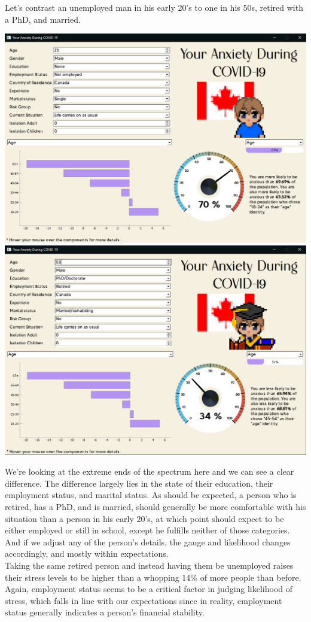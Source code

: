 \documentclass[fontsize=11pt]{article}
\begin{document}
	Let’s contrast an unemployed man in his early 20’s to one in his 50s, retired with a PhD, and married.
	\begin{center}
	\includegraphics[scale=0.30]{img/casestudy_screenshot_1}
	\includegraphics[scale=0.30]{img/casestudy_screenshot_2}
	\end{center}

	We’re looking at the extreme ends of the spectrum here and we can see a clear difference. The difference largely lies in the state of their education, their employment status, and marital status. As should be expected, a person who is retired, has a PhD, and is married, should generally be more comfortable with his situation than a person in his early 20’s, at which point should expect to be either employed or still in school, except he fulfills neither of those categories. And if we adjust any of the person’s details, the gauge and likelihood changes accordingly, and mostly within expectations. \\
	Taking the same retired person and instead having them be unemployed raises their stress levels to be higher than a whopping 14\% of more people than before. Again, employment status seems to be a critical factor in judging likelihood of stress, which falls in line with our expectations since in reality, employment status generally indicates a person’s financial stability.
\end{document}
